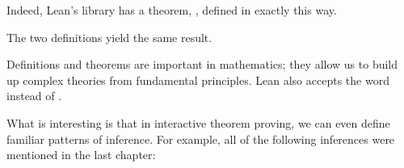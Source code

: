 \documentclass[letterpaper,10pt,english]{sphinxmanual}
\begin{document}
\sphinxAtStartPar
Indeed, Lean’s library has a theorem, ,
defined in exactly this way.

\sphinxAtStartPar
The two definitions yield the same result.

\sphinxAtStartPar
Definitions and theorems are important in mathematics; they allow us to build up complex theories from fundamental principles. Lean also accepts the word  instead of .

\sphinxAtStartPar
What is interesting is that in interactive theorem proving, we can even define familiar patterns of inference. For example, all of the following inferences were mentioned in the last chapter:

\begin{sphinxVerbatim}[commandchars=\\\{\}]
 

    

             
 
            
          

             
 
          
            

           
  

 
\end{sphinxVerbatim}
\end{document}
